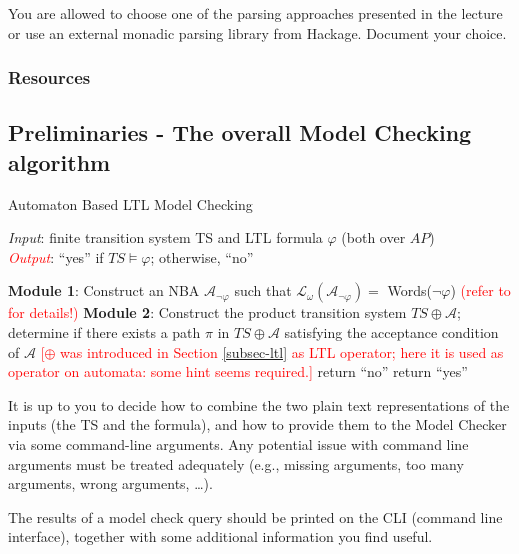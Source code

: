 \documentclass{article}
\begin{document}
You are allowed to choose one of the parsing approaches presented in the lecture or 
use an external monadic parsing library from Hackage. Document your choice.

\subsubsection*{Resources}
\cite[Paragraph 5.1 (in particular 5.1.1 and 5.1.2)]{BaKa}

\subsection{Preliminaries - The overall Model Checking algorithm}
\label{subsec-mca}
\begin{algorithm}[H]
    \caption{Automaton Based LTL Model Checking}
    \label{alg:mc}
    \hspace*{\algorithmicindent} \emph{Input}: finite transition system TS and LTL formula $\varphi$ (both over $AP$) \\
    \hspace*{\algorithmicindent} \textcolor{red}{\emph{Output}}: ``yes'' if $TS \vDash \varphi$; otherwise, ``no''
    \begin{algorithmic}[1]
    \State \textbf{Module 1}: Construct an NBA $\mathcal{A}_{\neg \varphi}$ such that $\mathcal{L}_{\omega}(\mathcal{A}_{\neg \varphi}) = $ Words($\neg \varphi$) \textcolor{red}{(refer to \cite{BaKa} for details!)}
    \State \textbf{Module 2}: Construct the product transition system $TS \oplus \mathcal{A}$; determine if there exists 
                a path $\pi$ in $TS \oplus \mathcal{A}$ satisfying the acceptance condition of $\mathcal{A}$
            \textcolor{red}{[$\oplus$ was introduced in Section \ref{subsec-ltl} as LTL operator; here it is
            used as operator on automata: some hint seems required.]}
        \State return ``no'' 
    \Else 
        \State return ``yes''
    \EndIf
    \end{algorithmic}
\end{algorithm}
  
It is up to you to decide how to combine the two plain text representations of the inputs (the TS and the formula), 
and how to provide them to the Model Checker via some command-line arguments. Any potential issue with 
command line arguments must be treated adequately (e.g., missing arguments, too many arguments, wrong arguments, \dots).

The results of a model check query should be printed on the CLI (command line interface), together with some additional 
information you find useful.
\end{document}
